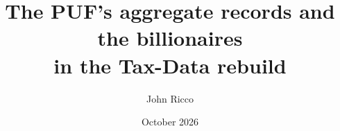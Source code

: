


\newcommand{\slidenote}[1]{\par\vfill{\scriptsize\color{yalegrey}#1}}

\title[The PUF's aggregate records and the billionaires]{The PUF's aggregate records and the billionaires\\in the Tax-Data rebuild}
\author{John Ricco}
\date{October 2026}




\begin{frame}
  \titlepage
\end{frame}

